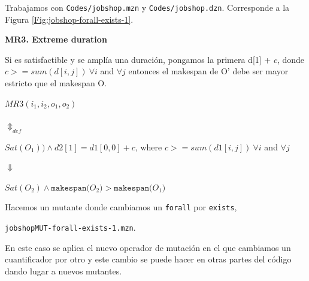 %

%

Trabajamos con \texttt{Codes/jobshop.mzn} y \texttt{Codes/jobshop.dzn}. Corresponde a la Figura \ref{Fig:jobshop-forall-exists-1}.


\begin{framed}
    \textbf{MR3. Extreme duration}
    
    Si es satisfactible y se amplía una duración, pongamos la primera  d[1] + $c$, donde $c >= sum(d[i,j]) \ \forall i$ and $\forall j$ 
    entonces el makespan de O' debe ser mayor estricto que el makespan O.
\end{framed}


\begin{framed}
\begin{center}
$MR3(i_1,i_2,o_1,o_2)$

$ \Updownarrow_{def}$

$Sat (O_1)) \wedge d2[1] =  d1[0,0] + c$, where $c >= sum(d1[i,j]) \ \forall i$ and $\forall j$  

$\Downarrow$

$Sat(O_2) \wedge  \texttt{makespan($O_2$)} > \texttt{makespan($O_1$)} $
\end{center}
\end{framed}


Hacemos un mutante donde cambiamos un \texttt{forall} por \texttt{exists}, 

\texttt{jobshopMUT-forall-exists-1.mzn}.

En este caso se aplica el nuevo operador de mutación en el que cambiamos un cuantificador por otro 
y este cambio se puede hacer en otras partes del código dando lugar a nuevos mutantes.

